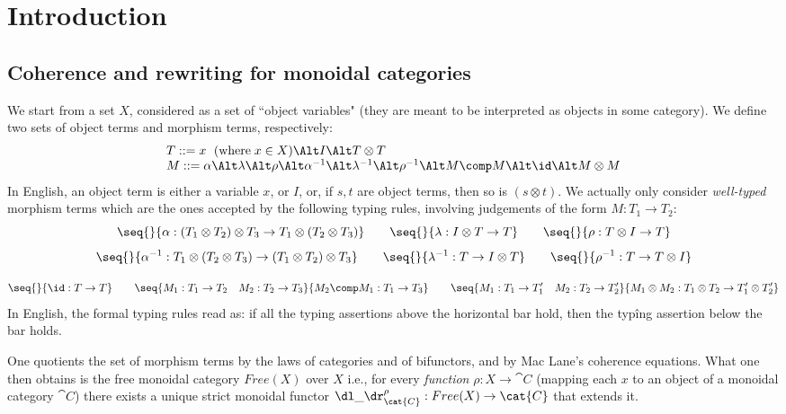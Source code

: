 
\section{Introduction} 
\label{s:introduction}






\subsection{Coherence and rewriting for monoidal categories}

We start from a set $X$, considered as a set of  ``object variables"  (they are meant to be interpreted as objects in some category).  We define two sets   of object terms and morphism terms, respectively:
$$\begin{array}{l}
T::= x\  \;(\mbox{where}\;x\in X) \Alt I \Alt T\otimes T\\
M ::= \alpha \Alt \lambda \Alt\rho\Alt  \alpha^{-1} \Alt \lambda^{-1} \Alt\rho^{-1} \Alt M\comp M\Alt \id\Alt M\otimes M
\end{array}$$
In English, an object term is either a variable $x$, or $I$, or, if $s,t$ are object terms, then so is $(s\otimes t)$.
We actually only consider {\em well-typed} morphism terms  which are the ones accepted by the following typing rules, involving judgements of the form $M:T_1\rightarrow T_2$:
$$\seq{}{\alpha:(T_1\otimes T_2)\otimes T_3\rightarrow T_1\otimes(T_2\otimes T_3)}\quad\quad
\seq{}{\lambda:I\otimes T\rightarrow T}\quad\quad\seq{}{\rho:T\otimes I\rightarrow T}$$
$$\seq{}{\alpha^{-1}:T_1\otimes(T_2\otimes T_3)\rightarrow (T_1\otimes T_2)\otimes T_3}\quad\quad
\seq{}{\lambda^{-1}: T\rightarrow I\otimes T}\quad\quad\seq{}{\rho^{-1}:T\rightarrow T\otimes I}$$

$$\seq{}{\id:T\rightarrow T}\quad\quad \seq{M_1:T_1\rightarrow T_2\quad M_2:T_2\rightarrow T_3}{M_2\comp M_1:T_1\rightarrow T_3}\quad\quad \seq{M_1:T_1\rightarrow T'_1\quad M_2:T_2\rightarrow T'_2}{M_1\otimes M_2:T_1\otimes T_2\rightarrow T'_1\otimes T'_2}$$
In English, the formal typing rules read as: if all the typing assertions above the horizontal bar hold, then the typîng assertion below the bar holds.

One quotients the set of morphism terms by the laws of categories and of bifunctors, and by Mac Lane's coherence equations.
What one then obtains is the free monoidal category ${Free}(X)$ over $X$ i.e., for every {\em function} $\rho:X\rightarrow \cat{C}$ (mapping each $x$ to an object of  a monoidal category $\cat{C}$) there exists a unique strict monoidal functor $\dl \_\dr^\rho_{\cat{C}}:{Free}(X)\rightarrow\cat{C}$ that extends it.

